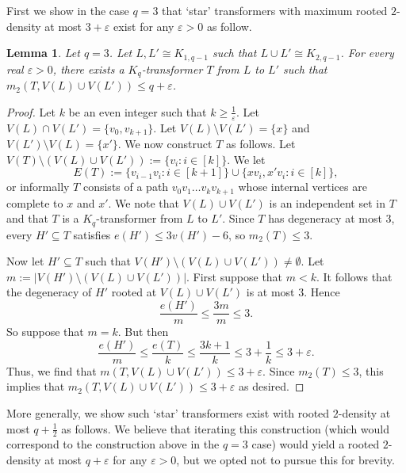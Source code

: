 \documentclass[11pt]{article}
\numberwithin{equation}{section}
\newcounter{i}
\theoremstyle{plain}
\newtheorem{lem}[thm]{Lemma}
\theoremstyle{plain} %
\theoremstyle{definition}
\begin{document}
First we show in the case $q=3$ that `star' transformers with maximum rooted $2$-density at most $3+\varepsilon$ exist for any $\varepsilon > 0$ as follow.

\begin{lem}\label{lem:StarTransformerTriangle}
Let $q=3$. Let $L,L' \cong K_{1,q-1}$ such that $L\cup L' \cong K_{2,q-1}$. For every real $\varepsilon > 0$, there exists a $K_q$-transformer $T$ from $L$ to $L'$ such that $m_2(T,V(L)\cup V(L')) \le q +\varepsilon$.
\end{lem}
\begin{proof}
Let $k$ be an even integer such that $k\ge \frac{1}{\varepsilon}$. Let $V(L)\cap V(L') = \{v_0,v_{k+1}\}$. Let $V(L)\setminus V(L') = \{x\}$ and $V(L')\setminus V(L) = \{x'\}$. We now construct $T$ as follows. Let $V(T)\setminus (V(L)\cup V(L')) := \{v_i : i\in [k] \}$. We let
$$E(T) := \{ v_{i-1}v_i : i\in [k+1]\} \cup \{ xv_i, x'v_i: i\in [k] \},$$
or informally $T$ consists of a path $v_0v_1\ldots v_kv_{k+1}$ whose internal vertices are complete to $x$ and $x'$. We note that $V(L)\cup V(L')$ is an independent set in $T$ and that $T$ is a $K_q$-transformer from $L$ to $L'$. Since $T$ has degeneracy at most $3$, every $H' \subseteq T$ satisfies $e(H') \leq 3v(H')-6$, so $m_2(T) \le 3$. 

Now let $H'\subseteq T$ such that $V(H')\setminus (V(L)\cup V(L'))\ne \emptyset$. Let $m:= |V(H')\setminus (V(L)\cup V(L'))|$. First suppose that $m < k$. It follows that the degeneracy of $H'$ rooted at $V(L)\cup V(L')$ is at most $3$. Hence
$$\frac{e(H')}{m} \le \frac{3m}{m} \le 3.$$
So suppose that $m=k$. But then
$$\frac{e(H')}{m} \le \frac{e(T)}{k} \le \frac{3k+1}{k} \le 3 + \frac{1}{k} \le 3 + \varepsilon.$$
Thus, we find that $m(T,V(L)\cup V(L'))\le 3+\varepsilon$. Since $m_2(T)\le 3$, this implies that $m_2(T,V(L)\cup V(L'))\le 3+\varepsilon$ as desired.
\end{proof}

More generally, we show such `star' transformers exist with rooted $2$-density at most $q+\frac{1}{2}$ as follows. We believe that iterating this construction (which would correspond to the construction above in the $q=3$ case) would yield a rooted $2$-density at most $q+\varepsilon$ for any $\varepsilon > 0$, but we opted not to pursue this for brevity.
\end{document}
